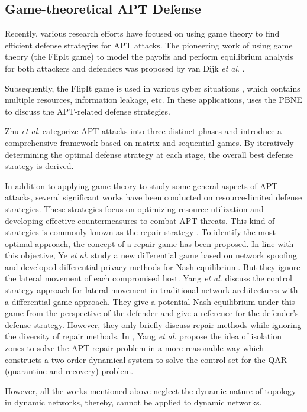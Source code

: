 \documentclass[lettersize,journal]{IEEEtran}
\begin{document}
\subsection{Game-theoretical APT Defense}
Recently, various research efforts have focused on using game theory to find efficient defense strategies for APT attacks. The pioneering work of using game theory (the FlipIt game) to model the payoffs and perform equilibrium analysis for both attackers and defenders was proposed by van Dijk \emph{et al}. \cite{van2013flipit}. 

Subsequently, the FlipIt game is used in various cyber situations \cite{zhang2019mathtt,feng2019dynamic}, which contains multiple resources, information leakage, etc. In these applications, \cite{huang2019adaptive} uses the PBNE to discuss the APT-related defense strategies. 

Zhu \emph{et al}. \cite{zhu2018multi} categorize APT attacks into three distinct phases and introduce a comprehensive framework based on matrix and sequential games. By iteratively determining the optimal defense strategy at each stage, the overall best defense strategy is derived.
\par
In addition to applying game theory to study some general aspects of APT attacks, several significant works have been conducted on resource-limited defense strategies. These strategies focus on optimizing resource utilization and developing effective countermeasures to combat APT threats. This kind of strategies is commonly known as the repair strategy \cite{yangEffectiveRepairStrategy2019}. To identify the most optimal approach, the concept of a repair game has been proposed. In line with this objective, Ye \emph{et al}. \cite{yeDifferentiallyPrivateGame2021} study a new differential game based on network spoofing and developed differential privacy methods for Nash equilibrium. But they ignore the lateral movement of each compromised host. 
Yang \emph{et al}. \cite{yangEffectiveRepairStrategy2019} discuss the control strategy approach for lateral movement in traditional network architectures with a differential game approach. They give a potential Nash equilibrium under this game from the perspective of the defender and give a reference for the defender's defense strategy. However, they only briefly discuss repair methods while ignoring the diversity of repair methods. In \cite{yangEffectiveQuarantineRecovery2021}, Yang \emph{et al}. propose the idea of isolation zones to solve the APT repair problem in a more reasonable way which constructs a two-order dynamical system to solve the control set for the QAR (quarantine and recovery) problem. \par
However, all the works mentioned above neglect the dynamic nature of topology in dynamic networks, thereby, cannot be applied to dynamic networks.
\end{document}
